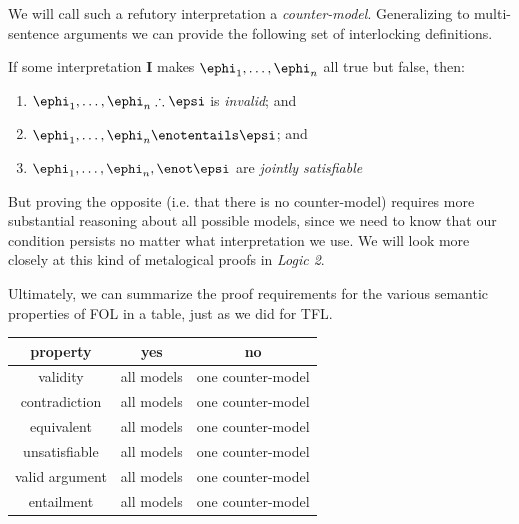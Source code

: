 We will call such a refutory interpretation a \emph{counter-model}. Generalizing
to multi-sentence arguments we can provide the following set of interlocking
definitions.

\begin{definition}
  \label{def:fol-countermodel-effects}
  If some interpretation \textbf{I} makes $\ephi_1,\dots,\ephi_n$ all true
  but \epsi false, then:\\
  \begin{enumerate}
    \item $\ephi_1,\dots,\ephi_n\therefore\epsi$ is \emph{invalid}; and
    \item $\ephi_1,\dots,\ephi_n\enotentails\epsi$; and
    \item $\ephi_1,\dots,\ephi_n,\enot\epsi$ are \emph{jointly satisfiable}
  \end{enumerate}
\end{definition}


But proving the opposite (i.e. that there is no counter-model) requires more
substantial reasoning about all possible models, since we need to know that
our condition persists no matter what interpretation we use. We will look more
closely at this kind of metalogical proofs in \emph{Logic 2}.


Ultimately, we can summarize the proof requirements for the various semantic
properties of FOL in a table, just as we did for TFL.

\begin{center}
  \begin{tabular}{c|c c}
    property & \textbf{yes} & \textbf{no} \\
    \hline
    validity       & all models & one counter-model \\
    contradiction  & all models & one counter-model \\
    equivalent     & all models & one counter-model \\
    unsatisfiable  & all models & one counter-model \\
    valid argument & all models & one counter-model \\
    entailment     & all models & one counter-model \\
  \end{tabular}
\end{center}

